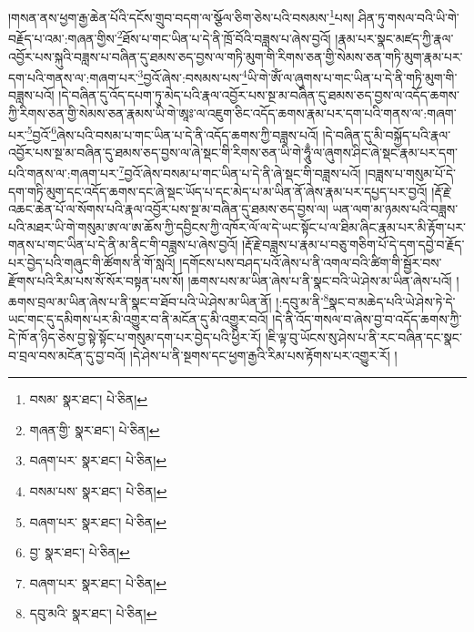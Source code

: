 །གསན་ནས་ཕྱག་རྒྱ་ཆེན་པོའི་དངོས་གྲུབ་བདག་ལ་སྩོལ་ཅིག་ཅེས་པའི་བསམས་\footnote{བསམ་  སྣར་ཐང་།  པེ་ཅིན། }པས། ཤིན་ཏུ་གསལ་བའི་ཡི་གེ་བརྗོད་པ་འམ་:གཞན་གྱིས་\footnote{གཞན་གྱི་  སྣར་ཐང་།  པེ་ཅིན། }ཐོས་པ་གང་ཡིན་པ་དེ་ནི་ཁྲོ་བོའི་བཟླས་པ་ཞེས་བྱའོ། །རྣམ་པར་སྣང་མཛད་ཀྱི་རྣལ་འབྱོར་པས་སྐུའི་བཟླས་པ་བཞིན་དུ་ཐམས་ཅད་བྱས་ལ་གཏི་མུག་གི་རིགས་ཅན་གྱི་སེམས་ཅན་གཏི་མུག་རྣམ་པར་དག་པའི་གནས་ལ་:གཞག་པར་\footnote{བཞག་པར་  སྣར་ཐང་།  པེ་ཅིན། }བྱའོ་ཞེས་:བསམས་པས་\footnote{བསམ་པས་  སྣར་ཐང་།  པེ་ཅིན། }ཡི་གེ་ཨོཾ་ལ་ཞུགས་པ་གང་ཡིན་པ་དེ་ནི་གཏི་མུག་གི་བཟླས་པའོ། །དེ་བཞིན་དུ་འོད་དཔག་ཏུ་མེད་པའི་རྣལ་འབྱོར་པས་སྔ་མ་བཞིན་དུ་ཐམས་ཅད་བྱས་ལ་འདོད་ཆགས་ཀྱི་རིགས་ཅན་གྱི་སེམས་ཅན་རྣམས་ཡི་གེ་ཨཱཿ་ལ་འཇུག་ཅིང་འདོད་ཆགས་རྣམ་པར་དག་པའི་གནས་ལ་:གཞག་པར་\footnote{བཞག་པར་  སྣར་ཐང་།  པེ་ཅིན། }བྱའོ་\footnote{བྱ་  སྣར་ཐང་།  པེ་ཅིན། }ཞེས་པའི་བསམ་པ་གང་ཡིན་པ་དེ་ནི་འདོད་ཆགས་ཀྱི་བཟླས་པའོ། །དེ་བཞིན་དུ་མི་བསྐྱོད་པའི་རྣལ་འབྱོར་པས་སྔ་མ་བཞིན་དུ་ཐམས་ཅད་བྱས་ལ་ཞེ་སྡང་གི་རིགས་ཅན་ཡི་གེ་ཧཱུྃ་ལ་ཞུགས་ཤིང་ཞེ་སྡང་རྣམ་པར་དག་པའི་གནས་ལ་:གཞག་པར་\footnote{བཞག་པར་  སྣར་ཐང་།  པེ་ཅིན། }བྱའོ་ཞེས་བསམ་པ་གང་ཡིན་པ་དེ་ནི་ཞེ་སྡང་གི་བཟླས་པའོ། །བཟླས་པ་གསུམ་པོ་དེ་དག་གཏི་མུག་དང་འདོད་ཆགས་དང་ཞེ་སྡང་ཡོད་པ་དང་མེད་པ་མ་ཡིན་ནོ་ཞེས་རྣམ་པར་དཔྱད་པར་བྱའོ། །རྡོ་རྗེ་འཆང་ཆེན་པོ་ལ་སོགས་པའི་རྣལ་འབྱོར་པས་སྔ་མ་བཞིན་དུ་ཐམས་ཅད་བྱས་ལ། ཡན་ལག་མ་ཉམས་པའི་བཟླས་པའི་མཐར་ཡི་གེ་གསུམ་ཨ་ལ་ཨ་ཆོས་ཀྱི་དབྱིངས་ཀྱི་འཁོར་ལོ་ལ་དེ་ཡང་སྟོང་པ་ལ་ཐིམ་ཞིང་རྣམ་པར་མི་རྟོག་པར་གནས་པ་གང་ཡིན་པ་དེ་ནི་མ་ནིང་གི་བཟླས་པ་ཞེས་བྱའོ། །རྡོ་རྗེ་བཟླས་པ་རྣམ་པ་བཅུ་གཅིག་པོ་དེ་དག་དབྱེ་བ་རྗོད་པར་བྱེད་པའི་གཞུང་གི་ཚོགས་ནི་གོ་སླའོ། །དགོངས་པས་བཤད་པའོ་ཞེས་པ་ནི་འགལ་བའི་ཚིག་གི་སྦྱོར་བས་རྫོགས་པའི་རིམ་པས་སོ་སོར་བསྟན་པས་སོ། །ཆགས་པས་མ་ཡིན་ཞེས་པ་ནི་སྣང་བའི་ཡེ་ཤེས་མ་ཡིན་ཞེས་པའོ། །ཆགས་བྲལ་མ་ཡིན་ཞེས་པ་ནི་སྣང་བ་ཐོབ་པའི་ཡེ་ཤེས་མ་ཡིན་ནོ། །:དབུ་མ་ནི་\footnote{དབུ་མའི་  སྣར་ཐང་།  པེ་ཅིན། }སྣང་བ་མཆེད་པའི་ཡེ་ཤེས་ཏེ་དེ་ཡང་གང་དུ་དམིགས་པར་མི་འགྱུར་བ་ནི་མངོན་དུ་མི་འགྱུར་བའོ། །དེ་ནི་འོད་གསལ་བ་ཞེས་བྱ་བ་འདོད་ཆགས་ཀྱི་དེ་ཁོ་ན་ཉིད་ཅེས་བྱ་སྟེ་སྟོང་པ་གསུམ་དག་པར་བྱེད་པའི་ཕྱིར་རོ། །ཇི་ལྟ་བུ་ཡོངས་སུ་ཤེས་པ་ནི་རང་བཞིན་དང་སྣང་བ་བྲལ་བས་མངོན་དུ་བྱ་བའོ། །དེ་ཤེས་པ་ནི་སྔགས་དང་ཕྱག་རྒྱའི་རིམ་པས་རྟོགས་པར་འགྱུར་རོ། །
